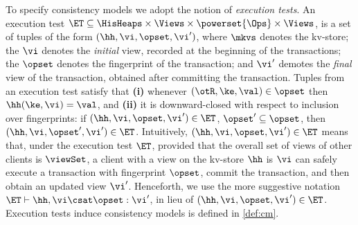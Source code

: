 To specify consistency models we adopt the notion of \emph{execution tests}. 
An execution test 
$\ET \subseteq \HisHeaps \times \Views \times \powerset{\Ops} \times \Views$, 
is a set of tuples of the form $(\hh, \vi, \opset, \vi')$, where $\mkvs$ denotes the kv-store;
the $\vi$ denotes the \emph{initial} view, recorded at the beginning of the transactions; 
the $\opset$ denotes the fingerprint of the transaction; and 
$\vi'$ demotes the \emph{final} view of the transaction, obtained after committing the transaction.
Tuples from an execution test satisfy that
\textbf{(i)} whenever $(\otR, \ke, \val) \in \opset$ then $\hh(\ke, \vi) = \val$, and \textbf{(ii)} 
it is downward-closed with respect to inclusion over fingerprints: 
if $(\hh, \vi, \opset, \vi') \in \ET$, $\opset' \subseteq \opset$, then 
$(\hh, \vi, \opset', \vi') \in \ET$.
Intuitively, 
$(\hh, \vi, \opset, \vi') \in \ET$ means that, under the execution test 
$\ET$, provided that the overall set of views of other clients is $\viewSet$, 
a client with a view on the kv-store $\hh$ is $\vi$ can safely 
execute a transaction with fingerprint $\opset$, commit the transaction,
and then obtain an updated view $\vi'$. 
Henceforth, we use the more 
suggestive notation $\ET \vdash \hh, \vi \csat \opset : \vi'$, 
in lieu of $(\hh, \vi, \opset, \vi') \in \ET$.
Execution tests induce consistency models is defined in \cref{def:cm}.
